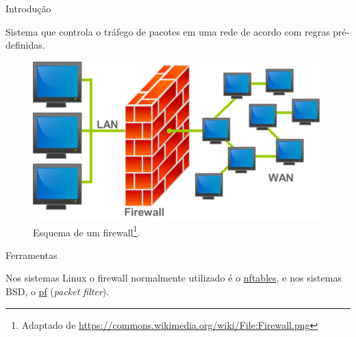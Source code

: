 \documentclass[]{article}
\begin{document}
\author{Adriano J. Holanda}










\title{\insertlecture}
\section{\insertlecture}

\begin{frame}{Introdução}
  
Sistema que controla o tráfego de pacotes em uma rede de acordo com
regras pré-definidas.

\begin{figure}[ht]
\centering
\includegraphics[scale=.7]{firewall.png}
\caption{Esquema de um firewall\footnote{\scriptsize Adaptado de
    \url{https://commons.wikimedia.org/wiki/File:Firewall.png}}.}
\end{figure}

\end{frame}

\begin{frame}{Ferramentas}

  Nos sistemas Linux o firewall normalmente utilizado é o
  \href{http://www.netfilter.org/projects/nftables/}{nftables}, e nos
  sistemas BSD, o \href{http://www.openbsd.org/faq/pf/}{pf} ({\em packet
    filter}).

\end{frame}
\end{document}

